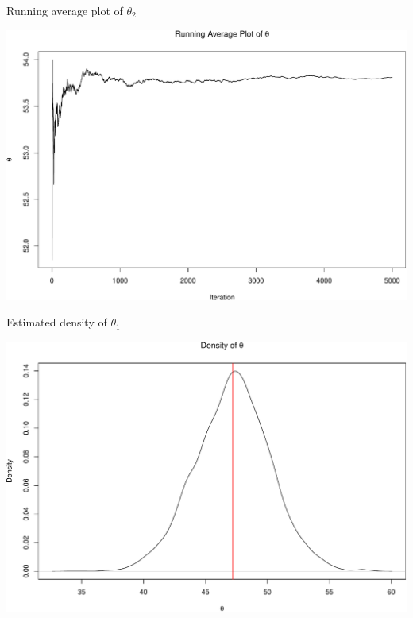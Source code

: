 \documentclass[
  ignorenonframetext,
]{beamer}
\begin{document}
\begin{frame}{Running average plot of \(\theta_2\)}
\protect\hypertarget{running-average-plot-of-theta_2}{}

\includegraphics{08-multivariate-norm_files/figure-beamer/unnamed-chunk-15-1.pdf}

\end{frame}

\begin{frame}{Estimated density of \(\theta_1\)}
\protect\hypertarget{estimated-density-of-theta_1}{}

\includegraphics{08-multivariate-norm_files/figure-beamer/unnamed-chunk-16-1.pdf}

\end{frame}
\end{document}
